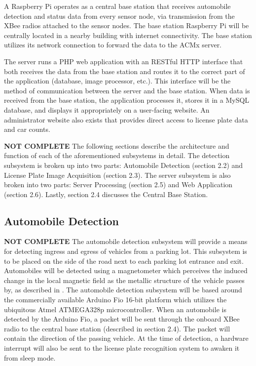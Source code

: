 \documentclass[11pt, oneside, fullpage, doublespace]{article}
\begin{document}
A Raspberry Pi operates as a central base station that receives automobile detection and status data from every sensor node, via transmission from the XBee radios attached to the sensor nodes. The base station Raspberry Pi will be centrally located in a nearby building with internet connectivity. The base station utilizes its network connection to forward the data to the ACMx server.

The server runs a PHP web application with an RESTful HTTP interface that both receives the data from the base station and routes it to the correct part of the application (database, image processor, etc.). This interface will be the method of communication between the server and the base station. When data is received from the base station, the application processes it, stores it in a MySQL database, and displays it appropriately on a user-facing website. An administrator website also exists that provides direct access to license plate data and car counts.

{\color{red}\textbf{NOT COMPLETE}} The following sections describe the architecture and function of each of the aforementioned subsystems in detail. The detection subsystem is broken up into two parts: Automobile Detection (section 2.2) and License Plate Image Acquisition (section 2.3). The server subsystem is also broken into two parts: Server Processing (section 2.5) and Web Application (section 2.6). Lastly, section 2.4 discusses the Central Base Station.

\subsection{Automobile Detection}
{\color{red}\textbf{NOT COMPLETE}}
The automobile detection subsystem will provide a means for detecting ingress and egress of vehicles from a parking lot. This subsystem is to be placed on the side of the road next to each parking lot entrance and exit. Automobiles will be detected using a magnetometer which perceives the induced change in the local magnetic field as the metallic structure of the vehicle passes by, as described in \cite{stillwell2013}. The automobile detection subsystem will be based around the commercially available Arduino Fio 16-bit  platform which utilizes the ubiquitous Atmel ATMEGA328p microcontroller. When an automobile is detected by the Arduino Fio, a packet will be sent through the onboard XBee radio to the central base station (described in section 2.4). The packet will  contain the direction of the passing vehicle. At the time of detection, a hardware interrupt will also be sent to the license plate recognition system to awaken it from sleep mode.
\end{document}
